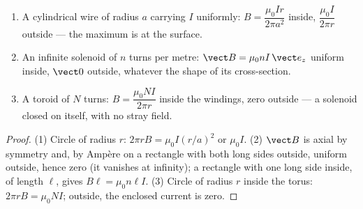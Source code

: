 \begin{proposition}\label{prop:b1:magnetostatics:ampereapps}
\begin{enumerate}
  \item A cylindrical wire of radius $a$ carrying $I$ uniformly:
        $B = \dfrac{\mu_0Ir}{2\pi a^2}$ inside, $\dfrac{\mu_0I}{2\pi r}$ outside
        --- the maximum is at the surface.
  \item An infinite solenoid of $n$ turns per metre: $\vect B = \mu_0nI\,
        \vect e_z$ uniform inside, $\vect 0$ outside, whatever the shape of
        its cross-section.
  \item A toroid of $N$ turns: $B = \dfrac{\mu_0NI}{2\pi r}$ inside the
        windings, zero outside --- a solenoid closed on itself, with no
        stray field.
\end{enumerate}
\end{proposition}

\begin{proof}
(1) Circle of radius $r$: $2\pi rB = \mu_0I(r/a)^2$ or $\mu_0I$. (2) $\vect B$
is axial by symmetry and, by Ampère on a rectangle with both long sides
outside, uniform outside, hence zero (it vanishes at infinity); a
rectangle with one long side inside, of length $\ell$, gives $B\ell =
\mu_0n\ell I$. (3) Circle of radius $r$ inside the torus: $2\pi rB =
\mu_0NI$; outside, the enclosed current is zero.
\end{proof}

